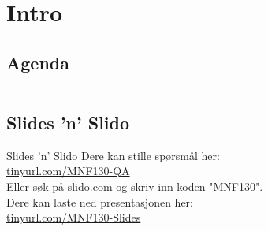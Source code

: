 \begin{frame}[t,plain]
    \titlepage
\end{frame}

\section{Intro}
\subsection*{Agenda}
\begin{frame}
    \begin{columns}[t]
        \begin{column}{.5\textwidth}
            \tableofcontents[sections={1-5}]
        \end{column}
        \begin{column}{.5\textwidth}
            \tableofcontents[sections={6-}]
        \end{column}
    \end{columns}
\end{frame}

\subsection*{Slides 'n' Slido}
\begin{frame}{Slides 'n' Slido}
    Dere kan stille spørsmål her:\\
    \url{tinyurl.com/MNF130-QA}\\
    Eller søk på slido.com og skriv inn koden "MNF130".\\[3mm]
    Dere kan laste ned presentasjonen her:\\
    \url{tinyurl.com/MNF130-Slides}
\end{frame}